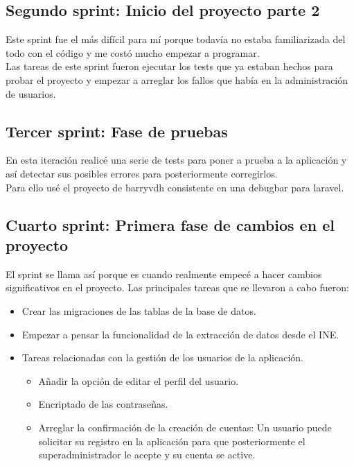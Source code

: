 \subsection{Segundo sprint: Inicio del proyecto parte 2}
Este sprint fue el más difícil para mí porque todavía no estaba familiarizada del todo con el código y me costó mucho empezar a programar.\\
Las tareas de este sprint fueron ejecutar los tests que ya estaban hechos para probar el proyecto y empezar a arreglar los fallos que había en la administración de usuarios.\\
\subsection{Tercer sprint: Fase de pruebas}
En esta iteración realicé una serie de tests para poner a prueba a la aplicación y así detectar sus posibles errores para posteriormente corregirlos.\\
Para ello usé el proyecto de barryvdh consistente en una debugbar para laravel.\\
\subsection{Cuarto sprint:  Primera fase de cambios en el proyecto}
El sprint se llama así porque es cuando realmente empecé a hacer cambios significativos en el proyecto.
Las principales tareas que se llevaron a cabo fueron:
\begin{itemize}
    \item Crear las migraciones de las tablas de la base de datos.
    \item Empezar a pensar la funcionalidad de la extracción de datos desde el INE.
    \item Tareas relacionadas con la gestión de los usuarios de la aplicación.
    \begin{itemize}
        \item Añadir la opción de editar el perfil del usuario.
        \item Encriptado de las contraseñas.
        \item Arreglar la confirmación de la creación de cuentas: Un usuario puede solicitar su registro en la aplicación para que posteriormente el superadministrador le acepte y su cuenta se active.
    \end{itemize}
\end{itemize}
